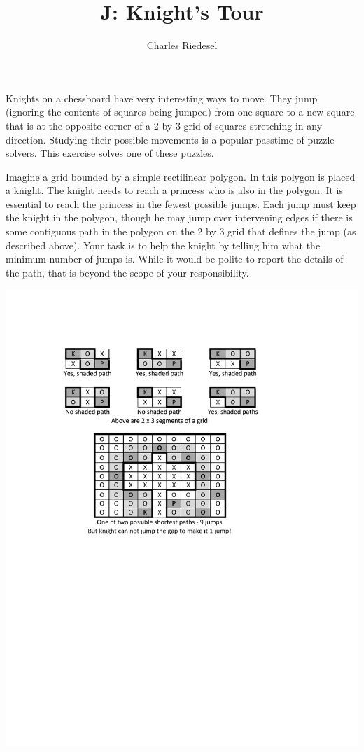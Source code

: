 \documentclass{article}
\title{J: Knight's Tour}
\author{Charles Riedesel}
\begin{document}
\begin{problemDescription}
Knights on a chessboard have very interesting ways to move.  They jump (ignoring
the contents of squares being jumped) from one square to a new square that is at
the opposite corner of a 2 by 3 grid of squares stretching in any direction.
Studying their possible movements is a popular passtime of puzzle solvers.  This
exercise solves one of these puzzles.

Imagine a grid bounded by a simple rectilinear polygon.  In this polygon is placed
a knight.  The knight needs to reach a princess who is also in the polygon.  It is
essential to reach the princess in the fewest possible jumps.  Each jump must keep
the knight in the polygon, though he may jump over intervening edges if there is
some contiguous path in the polygon on the 2 by 3 grid that defines the jump 
(as described above).  Your task is to help the knight by telling him what the 
minimum number of jumps is.  While it would be polite to report the details of 
the path, that is beyond the scope of your responsibility.

\vspace{-0.7in}
\begin{center}
\includegraphics[scale=0.55]{knightstourFigure.pdf}
\end{center}
\vspace{-2.0in}

\end{problemDescription}
\end{document}
